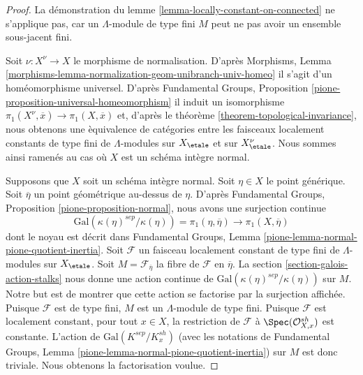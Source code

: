 \begin{proof}
La d\'emonstration du lemme \ref{lemma-locally-constant-on-connected}
ne s'applique pas, car un $\Lambda$-module de type fini $M$ peut ne pas avoir
un ensemble sous-jacent fini.

\medskip\noindent
Soit $\nu : X^\nu \to X$ le morphisme de normalisation. D'apr\`es Morphisms, Lemma
\ref{morphisms-lemma-normalization-geom-unibranch-univ-homeo}
il s'agit d'un hom\'eomorphisme universel. D'apr\`es
Fundamental Groups, Proposition \ref{pione-proposition-universal-homeomorphism}
il induit un isomorphisme
$\pi_1(X^\nu, \overline{x}) \to \pi_1(X, \overline{x})$
et, d'apr\`es le th\'eor\`eme \ref{theorem-topological-invariance}, nous obtenons
une \`equivalence de cat\'egories entre les faisceaux localement constants de type fini
de $\Lambda$-modules sur $X_\etale$ et sur $X^\nu_\etale$.
Nous sommes ainsi ramen\'es au cas o\`u $X$ est un sch\'ema int\`egre normal.

\medskip\noindent
Supposons que $X$ soit un sch\'ema int\`egre normal. Soit $\eta \in X$ le point g\'en\'erique.
Soit $\overline{\eta}$ un point g\'eom\'etrique au-dessus de $\eta$.
D'apr\`es Fundamental Groups, Proposition \ref{pione-proposition-normal},
nous avons une surjection continue
$$
\text{Gal}(\kappa(\eta)^{sep}/\kappa(\eta)) = \pi_1(\eta, \overline{\eta})
\longrightarrow
\pi_1(X, \overline{\eta})
$$
dont le noyau est d\'ecrit dans Fundamental Groups, Lemma
\ref{pione-lemma-normal-pione-quotient-inertia}.
Soit $\mathcal{F}$ un faisceau localement constant de type fini de $\Lambda$-modules
sur $X_\etale$. Soit $M = \mathcal{F}_{\overline{\eta}}$
la fibre de $\mathcal{F}$ en $\overline{\eta}$.
La section \ref{section-galois-action-stalks} nous donne une action continue de
$\text{Gal}(\kappa(\eta)^{sep}/\kappa(\eta))$ sur $M$.
Notre but est de montrer que cette action se factorise par la
surjection affich\'ee.
Puisque $\mathcal{F}$ est de type fini, $M$ est un $\Lambda$-module de type fini.
Puisque $\mathcal{F}$ est localement constant, pour tout $x \in X$,
la restriction de $\mathcal{F}$ \`a $\Spec(\mathcal{O}_{X, x}^{sh})$
est constante. L'action de $\text{Gal}(K^{sep}/K_x^{sh})$
(avec les notations de Fundamental Groups, Lemma
\ref{pione-lemma-normal-pione-quotient-inertia})
sur $M$ est donc triviale. Nous obtenons la factorisation voulue.


\end{proof}
